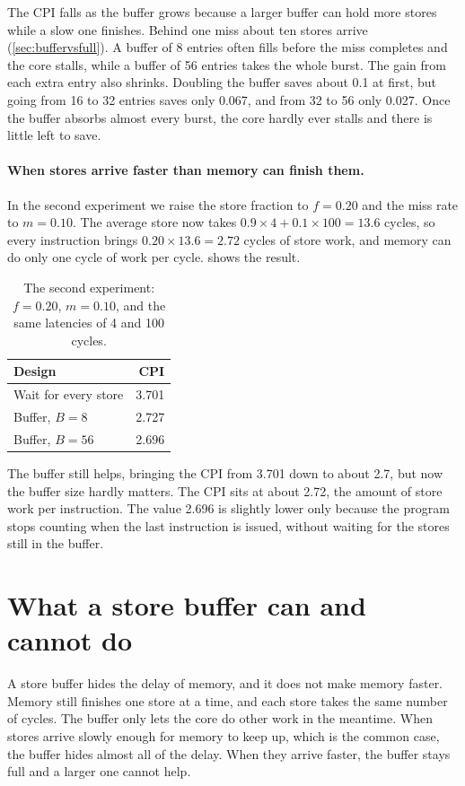 The CPI falls as the buffer grows because a larger buffer can hold more stores while a slow one finishes. Behind one miss about ten stores arrive (\cref{sec:buffervsfull}). A buffer of 8 entries often fills before the miss completes and the core stalls, while a buffer of 56 entries takes the whole burst. The gain from each extra entry also shrinks. Doubling the buffer saves about 0.1 at first, but going from 16 to 32 entries saves only 0.067, and from 32 to 56 only 0.027. Once the buffer absorbs almost every burst, the core hardly ever stalls and there is little left to save.

\paragraph{When stores arrive faster than memory can finish them.} In the second experiment we raise the store fraction to $f = 0.20$ and the miss rate to $m = 0.10$. The average store now takes $0.9 \times 4 + 0.1 \times 100 = 13.6$ cycles, so every instruction brings $0.20 \times 13.6 = 2.72$ cycles of store work, and memory can do only one cycle of work per cycle.  shows the result.

\begin{table}[!htbp]
\centering\small
\caption{The second experiment: $f = 0.20$, $m = 0.10$, and the same latencies of 4 and 100 cycles.}
\label{tab:cpi2}
\begin{tabular}{@{}lr@{}}
\toprule
Design & CPI\\
\midrule
Wait for every store & 3.701\\
Buffer, $B = 8$ & 2.727\\
Buffer, $B = 56$ & 2.696\\
\bottomrule
\end{tabular}
\end{table}

The buffer still helps, bringing the CPI from 3.701 down to about 2.7, but now the buffer size hardly matters. The CPI sits at about 2.72, the amount of store work per instruction. The value 2.696 is slightly lower only because the program stops counting when the last instruction is issued, without waiting for the stores still in the buffer.

\section{What a store buffer can and cannot do}
\label{sec:bufferlimits}

A store buffer hides the delay of memory, and it does not make memory faster. Memory still finishes one store at a time, and each store takes the same number of cycles. The buffer only lets the core do other work in the meantime. When stores arrive slowly enough for memory to keep up, which is the common case, the buffer hides almost all of the delay. When they arrive faster, the buffer stays full and a larger one cannot help.

